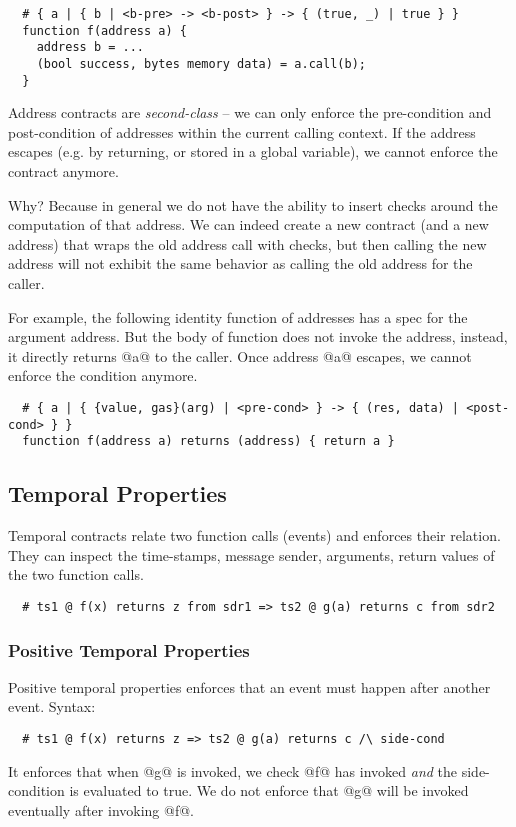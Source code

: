 \documentclass[acmsmall,review,anonymous]{acmart}\settopmatter{printfolios=true,printccs=false,printacmref=false}
\begin{document}
\begin{lstlisting}
  # { a | { b | <b-pre> -> <b-post> } -> { (true, _) | true } }
  function f(address a) {
    address b = ...
    (bool success, bytes memory data) = a.call(b);
  }
\end{lstlisting}

Address contracts are \emph{second-class} -- we can only enforce the
pre-condition and post-condition of addresses within the current calling
context.  If the address escapes (e.g. by returning, or stored in a global
variable), we cannot enforce the contract anymore.

Why? Because in general we do not have the ability to insert checks around the
computation of that address. We can indeed create a new contract (and a new address) that wraps the old address call with checks, but then calling
the new address will not exhibit the same behavior as calling the old address
for the caller.

For example, the following identity function of addresses has a spec
for the argument address. But the body of function does not invoke
the address, instead, it directly returns @a@ to the caller.
Once address @a@ escapes, we cannot enforce the condition anymore.

\begin{lstlisting}
  # { a | { {value, gas}(arg) | <pre-cond> } -> { (res, data) | <post-cond> } }
  function f(address a) returns (address) { return a }
\end{lstlisting}

\subsection{Temporal Properties}

Temporal contracts relate two function calls (events) and enforces their
relation.
They can inspect the time-stamps, message sender, arguments, return values
of the two function calls.

\begin{lstlisting}
  # ts1 @ f(x) returns z from sdr1 => ts2 @ g(a) returns c from sdr2
\end{lstlisting}

\subsubsection{Positive Temporal Properties}

Positive temporal properties enforces that an event must happen
after another event. Syntax:
\begin{lstlisting}
  # ts1 @ f(x) returns z => ts2 @ g(a) returns c /\ side-cond
\end{lstlisting}
It enforces that when @g@ is invoked, we check @f@ has invoked \emph{and}
the side-condition is evaluated to true.
We do not enforce that @g@ will be invoked eventually after invoking @f@.
\end{document}
